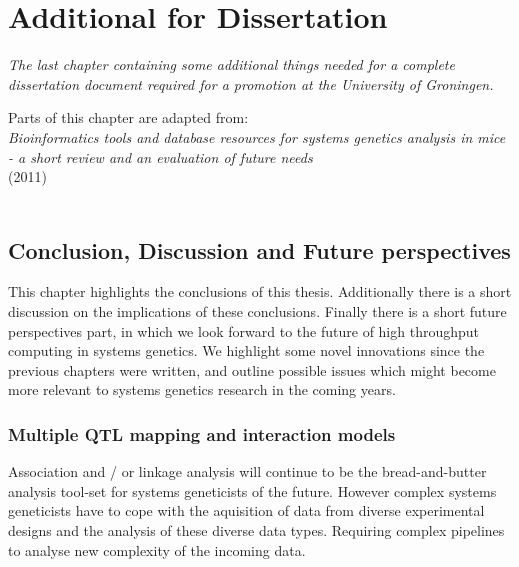 \chapter{Additional for Dissertation}
\thispagestyle{empty}
\emph{The last chapter containing some additional things needed for a complete 
dissertation document required for a promotion at the University of Groningen.}
\null
\vfill

\begin{myexampleblock}{Parts of this chapter are adapted from:}
  \\
  \emph{ Bioinformatics tools and database resources for systems genetics analysis in mice 
         - a short review and an evaluation of future needs}\\
   (2011)\\\\
\end{myexampleblock}

\newpage

\section*{Conclusion, Discussion and Future perspectives}
This chapter highlights the conclusions of this thesis. Additionally there is a short 
discussion on the implications of these conclusions. Finally there is a short future 
perspectives part, in which we look forward to the future of high throughput computing in 
systems genetics. We highlight some novel innovations since the previous chapters were 
written, and outline possible issues which might become more relevant to systems genetics 
research in the coming years.

\subsection*{Multiple QTL mapping and interaction models}
Association and / or linkage analysis will continue to be the bread-and-butter analysis 
tool-set for systems geneticists of the future. However complex systems geneticists have 
to cope with the aquisition of data from diverse experimental designs and the analysis of 
these diverse data types. Requiring complex pipelines to analyse new complexity of the incoming data.

